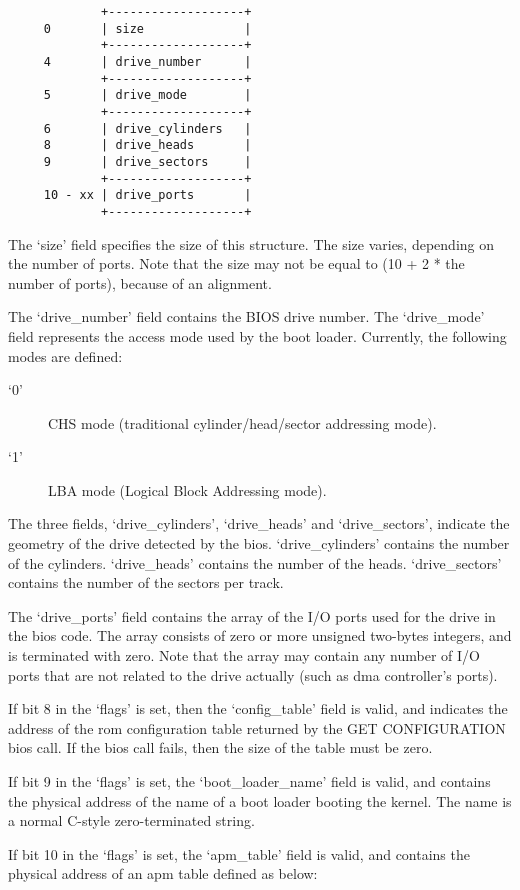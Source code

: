 \begin{verbatim}
             +-------------------+
     0       | size              |
             +-------------------+
     4       | drive_number      |
             +-------------------+
     5       | drive_mode        |
             +-------------------+
     6       | drive_cylinders   |
     8       | drive_heads       |
     9       | drive_sectors     |
             +-------------------+
     10 - xx | drive_ports       |
             +-------------------+
\end{verbatim}

The ‘size’ field specifies the size of this structure. The size varies,
depending on the number of ports. Note that the size may not be equal to (10 + 2
* the number of ports), because of an alignment.

The ‘drive\_number’ field contains the BIOS drive number. The ‘drive\_mode’
field represents the access mode used by the boot loader. Currently, the
following modes are defined:

\begin{description}
\item[‘0’]
CHS mode (traditional cylinder/head/sector addressing mode). 
\item[‘1’]
LBA mode (Logical Block Addressing mode).
\end{description}

The three fields, ‘drive\_cylinders’, ‘drive\_heads’ and ‘drive\_sectors’,
indicate the geometry of the drive detected by the bios. ‘drive\_cylinders’
contains the number of the cylinders. ‘drive\_heads’ contains the number of the
heads. ‘drive\_sectors’ contains the number of the sectors per track.

The ‘drive\_ports’ field contains the array of the I/O ports used for the drive
in the bios code. The array consists of zero or more unsigned two-bytes
integers, and is terminated with zero. Note that the array may contain any
number of I/O ports that are not related to the drive actually (such as dma
controller's ports).

If bit 8 in the ‘flags’ is set, then the ‘config\_table’ field is valid, and
indicates the address of the rom configuration table returned by the GET
CONFIGURATION bios call. If the bios call fails, then the size of the table must
be zero.

If bit 9 in the ‘flags’ is set, the ‘boot\_loader\_name’ field is valid, and
contains the physical address of the name of a boot loader booting the kernel.
The name is a normal C-style zero-terminated string.

If bit 10 in the ‘flags’ is set, the ‘apm\_table’ field is valid, and contains
the physical address of an apm table defined as below:

\secup




\secup